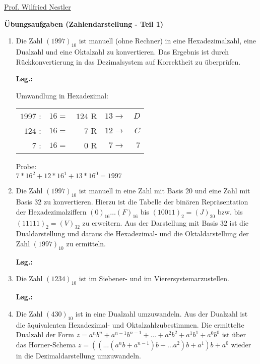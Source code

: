 \documentclass[12pt,a4paper]{scrreprt}
\newcommand{\Lsg}{\par \textbf{Lsg.: \hfill }}
\begin{document}
\begin{flushleft}%
\href{mailto:nestler@informatik.htw-dresden.de}{Prof. Wilfried Nestler}
\end{flushleft}

\large\textbf{Übungsaufgaben (Zahlendarstellung - Teil 1)}

\begin{enumerate}

\item Die Zahl $(1997)_{10}$ ist manuell (ohne Rechner) in eine Hexadezimalzahl, eine Dualzahl und eine Oktalzahl zu konvertieren. Das Ergebnis ist durch Rückkonvertierung in das Dezimalsystem auf Korrektheit zu überprüfen.

\Lsg
\par Umwandlung in Hexadezimal: \\
\begin{tabular}{rrrrr}
    $1997$ : & $16 =$ & $124$ R & $13 \rightarrow $ & $D$ \\
    $ 124$ : & $16 =$ & $  7$ R & $12 \rightarrow $ & $C$ \\
    $   7$ : & $16 =$ & $  0$ R & $ 7 \rightarrow $ & $7$
\end{tabular}
\par Probe: \\
\begin{math}
    7*16^2 + 12*16^1 + 13*16^0 = 1997
\end{math}

\item Die Zahl $(1997)_{10}$ ist manuell in eine Zahl mit Basis $20$ und eine Zahl mit Basis $32$ zu konvertieren. Hierzu ist die Tabelle der binären Repräsentation der Hexadezimalziffern $(0)_{16} \ldots (F)_{16}$ bis $(10011)_{2} = (J)_{20}$ bzw. bis $(11111)_{2} = (V)_{32}$ zu erweitern. Aus der Darstellung mit Basis $32$ ist die Dualdarstellung und daraus die Hexadezimal- und die Oktaldarstellung der Zahl $(1997)_{10}$ zu ermitteln.

\Lsg%

\item Die Zahl $(1234)_{10}$ ist im Siebener- und im Vierersystemarzustellen.

\Lsg%

\item Die Zahl $(430)_{10}$ ist in eine Dualzahl umzuwandeln. Aus der Dualzahl ist die äquivalenten Hexadezimal- und Oktalzahlzubestimmen. Die ermittelte Dualzahl der Form $z=a^n b^n +a^{n-1} b^{n - 1} + \ldots + a^2 b^2 + a^1 b^1 + a^0 b^0 $ ist über das Horner-Schema $ z = ((\ldots(a^n b+a^{n-1} )b + \ldots a^2 ) b + a^1 ) b + a^0$ wieder in die Dezimaldarstellung umzuwandeln.


\end{enumerate}
\end{document}
